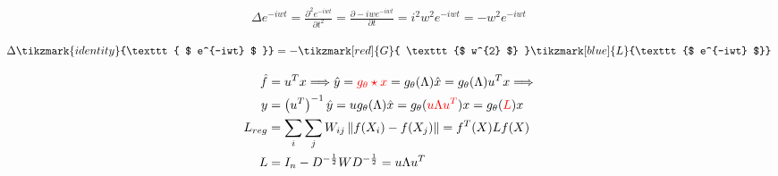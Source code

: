     \begin{align}
        \Delta e^{-iwt} = \frac{\partial^2 e^{-iwt}}{\partial t^2} = \frac{\partial -iwe^{-iwt}}{\partial t} = i^{2} w^{2}e^{-iwt} = -w^{2}e^{-iwt} 
    \end{align}
    
    \[
        \Delta  \tikzmark{identity}{\texttt{ $ e^{-iwt} $ }} = -\tikzmark[red]{G}{ \texttt{$ w^{2} $} }
    \tikzmark[blue]{L}{\texttt{$ e^{-iwt} $}}
    \]
  

    \begin{align}
        \hat{f} & = u^{T}x \Longrightarrow \hat{y} = {\color{myred} g_{\theta} \star x} = g_{\theta} (\Lambda) \hat{x} =  g_{\theta} (\Lambda) u^{T}x   \Longrightarrow \\
        y  & = \left( u^{T}\right) ^{-1} \hat{y} =  u g_{\theta} (\Lambda)  \hat{x} = g_{\theta} ({\color{myred}u \Lambda u^{T}}) x = g_{\theta} ({\color{myred}L}) x \\
        L_{reg} & =  \sum_{i} \sum_{j} W_{ij}  \left \| f(X_{i}) -f(X_{j}) \right \|  =f ^{T} (X) L f(X) \\
        L & = I_{n} - D^{-\frac{1}{2}}W D^{-\frac{1}{2}} = u \Lambda u^{T}
    \end{align}

